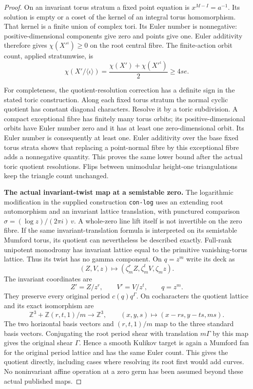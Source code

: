 \begin{proof}
On an invariant torus stratum a fixed point equation is
\(x^{M-I}=a^{-1}\).  Its solution is empty or a coset
of the kernel of an integral torus homomorphism.  That
kernel is a finite union of complex tori.  Its Euler
number is nonnegative: positive-dimensional components
give zero and points give one.  Euler additivity therefore
gives \(\chi(X'^{\iota})\ge0\) on the root central fibre.
The finite-action orbit count, applied stratumwise, is
\[
 \chi(X'/\langle\iota\rangle)
       =\frac{\chi(X')+\chi(X'^{\iota})}{2}
       \ge4se.                                        \tag{P3K.20.3}
\]

For completeness, the quotient-resolution correction has
a definite sign in the stated toric construction.  Along
each fixed torus stratum the normal cyclic quotient has
constant diagonal characters.  Resolve it by a toric
subdivision.  A compact exceptional fibre has finitely
many torus orbits; its positive-dimensional orbits have
Euler number zero and it has at least one zero-dimensional
orbit.  Its Euler number is consequently at least one.
Euler additivity over the base fixed torus strata shows
that replacing a point-normal fibre by this exceptional
fibre adds a nonnegative quantity.  This proves the same
lower bound after the actual toric quotient resolutions.
Flips between unimodular height-one triangulations keep
the triangle count unchanged.

\par\medskip\noindent\textbf{The actual invariant-twist map at a semistable zero.}\enspace
The logarithmic modification in the supplied construction
\texttt{con-log} uses an extending root automorphism and
an invariant lattice translation, with punctured comparison
\(\sigma=(\log z)/(2\pi i)\,v\).  A whole-zero line
lift itself is not invertible on the zero fibre.  If the
same invariant-translation formula is interpreted on its
semistable Mumford torus, its quotient can nevertheless
be described exactly.  Full-rank unipotent monodromy has
invariant lattice equal to the primitive vanishing-torus
lattice.  Thus its twist has no gamma component.
On \(q=z^m\) write its deck as
\[
 (Z,V,z)\longmapsto
       (\zeta_m^r Z,\zeta_m^t V,\zeta_m z).
\]
The invariant coordinates are
\[
               Z'=Z/z^r,\qquad V'=V/z^t,\qquad q=z^m.
\]
They preserve every original period \(c(q)q^\Gamma\).
On cocharacters the quotient lattice and its exact
isomorphism are
\[
 \mathbb Z^3+\mathbb Z(r,t,1)/m
      \longrightarrow\mathbb Z^3,
 \qquad (x,y,s)\longmapsto(x-rs,y-ts,ms).
\]
The two horizontal basis vectors and \((r,t,1)/m\)
map to the three standard basis vectors.  Conjugating
the root period shear with translation \(m\Gamma\)
by this map gives the original shear \(\Gamma\).
Hence a smooth Kulikov target is again a Mumford fan
for the original period lattice and has the same Euler
count.  This gives the quotient directly, including
cases where resolving its root first would add curves.
No noninvariant affine operation at a zero germ has
been assumed beyond these actual published maps.


\end{proof}
